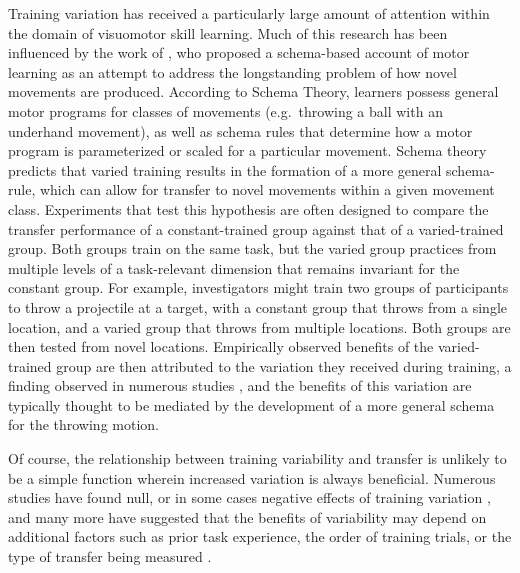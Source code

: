 \documentclass[
  12pt,
  letterpaper,
]{article}
\begin{document}
Training variation has received a particularly large amount of attention
within the domain of visuomotor skill learning. Much of this research
has been influenced by the work of
\textcite{schmidtSchemaTheoryDiscrete1975}, who proposed a schema-based
account of motor learning as an attempt to address the longstanding
problem of how novel movements are produced. According to Schema Theory,
learners possess general motor programs for classes of movements
(e.g.~throwing a ball with an underhand movement), as well as schema
rules that determine how a motor program is parameterized or scaled for
a particular movement. Schema theory predicts that varied training
results in the formation of a more general schema-rule, which can allow
for transfer to novel movements within a given movement class.
Experiments that test this hypothesis are often designed to compare the
transfer performance of a constant-trained group against that of a
varied-trained group. Both groups train on the same task, but the varied
group practices from multiple levels of a task-relevant dimension that
remains invariant for the constant group. For example, investigators
might train two groups of participants to throw a projectile at a
target, with a constant group that throws from a single location, and a
varied group that throws from multiple locations. Both groups are then
tested from novel locations. Empirically observed benefits of the
varied-trained group are then attributed to the variation they received
during training, a finding observed in numerous studies
\autocite{catalanoDistantTransferCoincident1984a,chuaPracticeVariabilityPromotes2019,goodwinEffectDifferentQuantities1998,kerrSpecificVariedPractice1978,wulfEffectTypePractice1991},
and the benefits of this variation are typically thought to be mediated
by the development of a more general schema for the throwing motion.

Of course, the relationship between training variability and transfer is
unlikely to be a simple function wherein increased variation is always
beneficial. Numerous studies have found null, or in some cases negative
effects of training variation
\autocite{deloshExtrapolationSineQua1997,sinkeviciuteRoleInputVariability2019,wrisbergVariabilityPracticeHypothesis1987},
and many more have suggested that the benefits of variability may depend
on additional factors such as prior task experience, the order of
training trials, or the type of transfer being measured
\autocite{bernikerEffectsTrainingBreadth2014,braithwaiteEffectsVariationPrior2015,hahnEffectsCategoryDiversity2005,lavanEffectsHighVariability2019,northEffectConsistentVaried2019,sadakataIndividualAptitudeMandarin2014,zamanPerceptualVariabilityImplications2021}.
\end{document}
